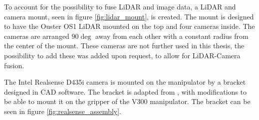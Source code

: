 To account for the possibility to fuse LiDAR and image data, a LiDAR and camera mount, seen in figure \ref{fig:lidar_mount}, is created. The mount is designed to have the Ouster OS1 LiDAR mounted on the top and four cameras inside. The cameras are arranged $90\deg$ away from each other with a constant radius from the center of the mount. These cameras are not further used in this thesis, the possibility to add these was added upon request, to allow for LiDAR-Camera fusion.



The Intel Realsense D435i camera is mounted on the manipulator by a bracket designed in CAD software. The bracket is adapted from \cite{d435_sleeve}, with modifications to be able to mount it on the gripper of the V300 manipulator. The bracket can be seen in figure \ref{fig:realsense_assembly}.


